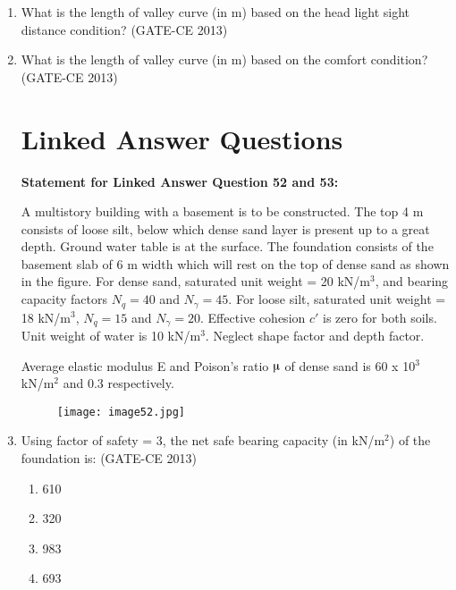 \documentclass[journal,12pt,onecolumn]{article}
\theoremstyle{remark}
\begin{document}
\begin{enumerate}
    
    \item What is the length of valley curve (in m) based on the head light sight distance condition? \underline{\hspace{3cm}} (GATE-CE 2013)
    
    \item What is the length of valley curve (in m) based on the comfort condition? \underline{\hspace{3cm}} (GATE-CE 2013)


\section*{Linked Answer Questions}
    
\textbf{Statement for Linked Answer Question 52 and 53:}


A multistory building with a basement is to be constructed. The top 4 m consists of loose silt, below which dense sand layer is present up to a great depth. Ground water table is at the surface. The foundation consists of the basement slab of 6 m width which will rest on the top of dense sand as shown in the figure. For dense sand, saturated unit weight = 20 kN/m$^3$, and bearing capacity factors $N_q = 40$ and $N_\gamma = 45$. For loose silt, saturated unit weight = 18 kN/m$^3$, $N_q = 15$ and $N_\gamma = 20$. Effective cohesion $c'$ is zero for both soils. Unit weight of water is 10 kN/m$^3$. Neglect shape factor and depth factor.

Average elastic modulus E and Poison's ratio $\micro$ of dense sand is 60 x 10$^3$kN/m$^2$ and 0.3 respectively.

 \begin{figure}[H]
    \centering
    \texttt{[image: image52.jpg]}  
    \caption{}
    \label{fig:10}
    \end{figure}

    
    \item Using factor of safety = 3, the net safe bearing capacity (in kN/m$^2$) of the foundation is: (GATE-CE 2013)
    \begin{multicols}{4}
    \begin{enumerate}
        \item 610 
        \item 320 
        \item 983 
        \item 693
    \end{enumerate}
    \end{multicols}
    

\end{enumerate}
\end{document}
